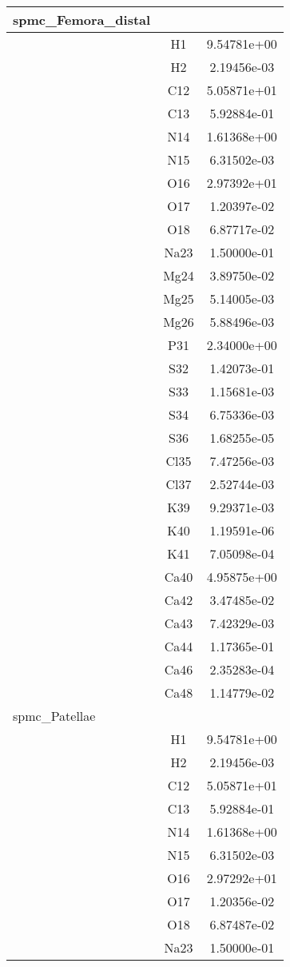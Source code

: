 \begin{centering}
\begin{longtable}{l c c}
\hline
spmc\_Femora\_distal & & \\
\hline
& H1 & 9.54781e+00 \\ 
& H2 & 2.19456e-03 \\ 
& C12 & 5.05871e+01 \\ 
& C13 & 5.92884e-01 \\ 
& N14 & 1.61368e+00 \\ 
& N15 & 6.31502e-03 \\ 
& O16 & 2.97392e+01 \\ 
& O17 & 1.20397e-02 \\ 
& O18 & 6.87717e-02 \\ 
& Na23 & 1.50000e-01 \\ 
& Mg24 & 3.89750e-02 \\ 
& Mg25 & 5.14005e-03 \\ 
& Mg26 & 5.88496e-03 \\ 
& P31 & 2.34000e+00 \\ 
& S32 & 1.42073e-01 \\ 
& S33 & 1.15681e-03 \\ 
& S34 & 6.75336e-03 \\ 
& S36 & 1.68255e-05 \\ 
& Cl35 & 7.47256e-03 \\ 
& Cl37 & 2.52744e-03 \\ 
& K39 & 9.29371e-03 \\ 
& K40 & 1.19591e-06 \\ 
& K41 & 7.05098e-04 \\ 
& Ca40 & 4.95875e+00 \\ 
& Ca42 & 3.47485e-02 \\ 
& Ca43 & 7.42329e-03 \\ 
& Ca44 & 1.17365e-01 \\ 
& Ca46 & 2.35283e-04 \\ 
& Ca48 & 1.14779e-02 \\ 
\hline
spmc\_Patellae & & \\
\hline
& H1 & 9.54781e+00 \\ 
& H2 & 2.19456e-03 \\ 
& C12 & 5.05871e+01 \\ 
& C13 & 5.92884e-01 \\ 
& N14 & 1.61368e+00 \\ 
& N15 & 6.31502e-03 \\ 
& O16 & 2.97292e+01 \\ 
& O17 & 1.20356e-02 \\ 
& O18 & 6.87487e-02 \\ 
& Na23 & 1.50000e-01 \\ 

\end{longtable}
\end{centering}
